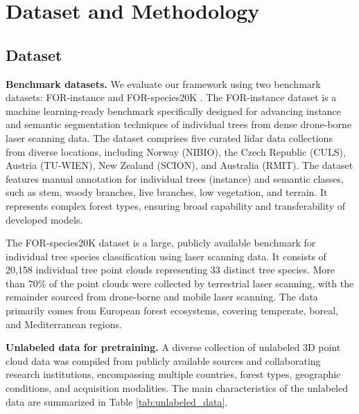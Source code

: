 \documentclass[review,authoryear]{elsarticle}
\begin{document}
\section{Dataset and Methodology}
\label{sec:methodology}

\subsection{Dataset}
\label{sec:dataset}

\textbf{Benchmark datasets.} We evaluate our framework using two benchmark datasets: FOR-instance \citep{Puliti2023FORinstance} and FOR-species20K \citep{Puliti2025}. The FOR-instance dataset is a machine learning-ready benchmark specifically designed for advancing instance and semantic segmentation techniques of individual trees from dense drone-borne laser scanning data. The dataset comprises five curated lidar data collections from diverse locations, including Norway (NIBIO), the Czech Republic (CULS), Austria (TU-WIEN), New Zealand (SCION), and Australia (RMIT). The dataset features manual annotation for individual trees (instance) and semantic classes, such as stem, woody branches, live branches, low vegetation, and terrain. It represents complex forest types, ensuring broad capability and transferability of developed models.


The FOR-species20K dataset is a large, publicly available benchmark for individual tree species classification using laser scanning data. It consists of 20,158 individual tree point clouds representing 33 distinct tree species. More than 70\% of the point clouds were collected by terrestrial laser scanning, with the remainder sourced from drone-borne and mobile laser scanning. The data primarily comes from European forest ecosystems, covering temperate, boreal, and Mediterranean regions.

\textbf{Unlabeled data for pretraining.} A diverse collection of unlabeled 3D point cloud data was compiled from publicly available sources and collaborating research institutions, encompassing multiple countries, forest types, geographic conditions, and acquisition modalities. The main characteristics of the unlabeled data are summarized in Table \ref{tab:unlabeled_data}.
\end{document}
